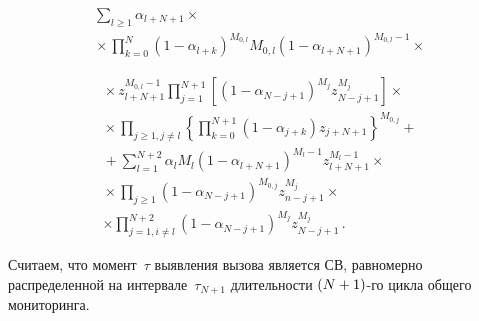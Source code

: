 \begin{multicols}{2}
\vspace*{-2pt}

\noindent
  \begin{multline*}
  \sum\limits_{l\geq1} \alpha_{l+N+1}\times{}\\
  {}\times \prod\limits^N_{k=0} \left(1-
\alpha_{l+k}\right)^{M_{0,l}}
M_{0,l}\left( 1-\alpha_{l+N+1}\right)^{M_{0,l}-1}\times{}
\end{multline*}

\noindent
 \begin{multline*}
{}\times  
z_{l+N+1}^{M_{0,l}-1} \prod\limits_{j=1}^{N+1}
  \left[(1-\alpha_{N-j+1})^{M_j} z^{M_j}_{N-j+1}\right] \times{}\\
  {}\times \prod\limits_{j\geq1, j\not=l} \left\{
  \prod\limits_{k=0}^{N+1}\left( 1-\alpha_{j+k}\right) 
z_{j+N+1}\right\}^{M_{0,j}}+{}\\
{}+
 \sum\limits_{l=1}^{N+2} \alpha_l M_l\left( 1-\alpha_{l+N+1}\right)^{M_{l}-1}
  z^{M_l-1}_{l+N+1}\times{}\\
 {}\times
  \prod\limits_{j\geq1} \left(1-\alpha_{N-j+1}\right)^{M_{0,j}} 
  z^{M_j}_{n-j+1}\times{}\\
  \times 
 \prod\limits_{j=1,i\not=l}^{N+2} 
  \left( 1-\alpha_{N-j+1}\right)^{M_j} 
z^{M_j}_{N-j+1}\,.
  \end{multline*}

  Считаем, что момент~$\tau$ выявления вызова является 
СВ, равномерно распределенной на интервале~$\tau_{N+1}$ 
длительности $(N\hm+1)$-го цикла общего мониторинга.
  

\end{multicols}
